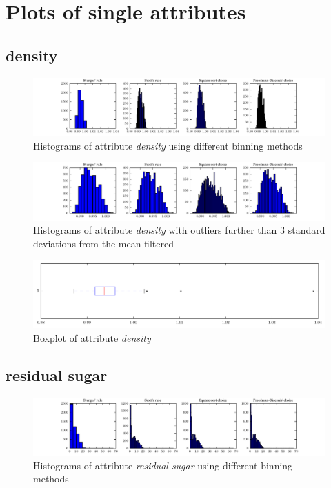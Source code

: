 \documentclass{report}
\begin{document}
\section{Plots of single attributes}

\subsection{density}
\begin{figure}[H]
\includegraphics[width=\textwidth]{histograms/density.pdf}
\caption{Histograms of attribute \emph{density} using different binning methods}\end{figure}

\begin{figure}[H]
\includegraphics[width=\textwidth]{histograms/density_filtered.pdf}
\caption{Histograms of attribute \emph{density} with outliers further than 3 standard deviations from the mean filtered}\n\end{figure}

\begin{figure}[H]
\includegraphics[width=\textwidth]{boxplots/density.pdf}
\caption{Boxplot of attribute \emph{density}}\end{figure}

\newpage\subsection{residual sugar}
\begin{figure}[H]
\includegraphics[width=\textwidth]{histograms/residual_sugar.pdf}
\caption{Histograms of attribute \emph{residual sugar} using different binning methods}\end{figure}
\end{document}
